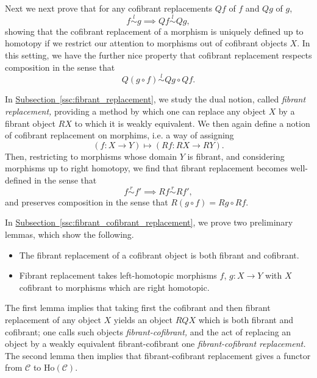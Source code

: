 \documentclass[main.tex]{subfiles}
\begin{document}
Next we next prove that for any cofibrant replacements $Qf$ of $f$ and $Qg$ of $g$,
\begin{equation*}
  f \overset{l}{\sim} g \implies Qf \overset{l}{\sim} Qg,
\end{equation*}
showing that the cofibrant replacement of a morphism is uniquely defined up to homotopy if we restrict our attention to morphisms out of cofibrant objects $X$. In this setting, we have the further nice property that cofibrant replacement respects composition in the sense that
\begin{equation*}
  Q(g \circ f) \overset{l}{\sim} Qg \circ Qf.
\end{equation*}

In \hyperref[ssc:fibrant_replacement]{Subsection~\ref*{ssc:fibrant_replacement}}, we study the dual notion, called \emph{fibrant replacement,} providing a method by which one can replace any object $X$ by a fibrant object $RX$ to which it is weakly equivalent. We then again define a notion of cofibrant replacement on morphims, i.e. a way of assigning
\begin{equation*}
  (f\colon X \to Y) \mapsto (Rf\colon RX \to RY).
\end{equation*}
Then, restricting to morphisms whose domain $Y$ is fibrant, and considering morphisms up to right homotopy, we find that fibrant replacement becomes well-defined in the sense that
\begin{equation*}
  f \overset{r}{\sim} f' \implies Rf \overset{r}{\sim} Rf',
\end{equation*}
and preserves composition in the sense that $R(g \circ f) = Rg \circ Rf$.

In \hyperref[ssc:fibrant_cofibrant_replacement]{Subsection~\ref*{ssc:fibrant_cofibrant_replacement}}, we prove two preliminary lemmas, which show the following.
\begin{itemize}
  \item The fibrant replacement of a cofibrant object is both fibrant and cofibrant.

  \item Fibrant replacement takes left-homotopic morphisms $f$, $g\colon X \to Y$ with $X$ cofibrant to morphisms which are right homotopic.
\end{itemize}
The first lemma implies that taking first the cofibrant and then fibrant replacement of any object $X$ yields an object $RQX$ which is both fibrant and cofibrant; one calls such objects \emph{fibrant-cofibrant,} and the act of replacing an object by a weakly equivalent fibrant-cofibrant one \emph{fibrant-cofibrant replacement.} The second lemma then implies that fibrant-cofibrant replacement gives a functor from $\mathcal{C}$ to $\mathrm{Ho}(\mathcal{C})$.
\end{document}
